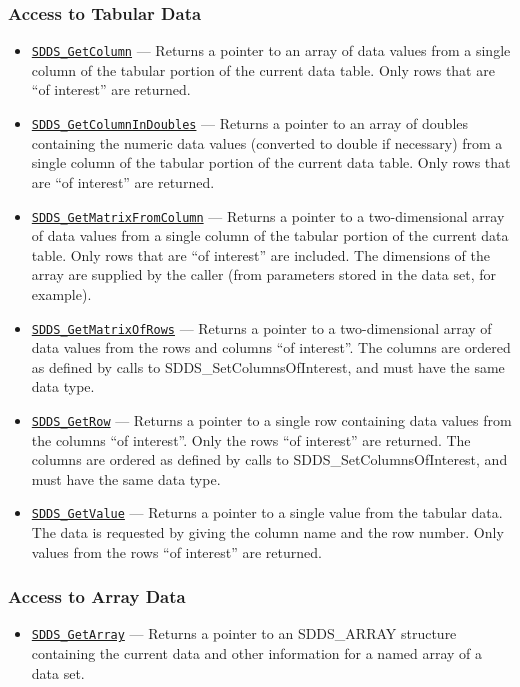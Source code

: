 \documentclass[11pt]{article}
\newcommand{\progref}[1]{\hyperref[SDDS_#1]{\tt SDDS\_#1}}
\begin{document}
\subsubsection{Access to Tabular Data}

\begin{itemize}
\item \progref{GetColumn} --- Returns a pointer to an array of data values from a single column of the tabular portion of the current data table. Only rows that are ``of interest'' are returned.
\item \progref{GetColumnInDoubles} --- Returns a pointer to an array of doubles containing the numeric data values (converted to double if necessary) from a single column of the tabular portion of the current data table. Only rows that are ``of interest'' are returned.
\item \progref{GetMatrixFromColumn} --- Returns a pointer to a two-dimensional array of data values from a single column of the tabular portion of the current data table. Only rows that are ``of interest'' are included. The dimensions of the array are supplied by the caller (from parameters stored in the data set, for example).
\item \progref{GetMatrixOfRows} --- Returns a pointer to a two-dimensional array of data values from the rows and columns ``of interest''. The columns are ordered as defined by calls to SDDS\_SetColumnsOfInterest, and must have the same data type.
\item \progref{GetRow} --- Returns a pointer to a single row containing data values from the columns ``of interest''. Only the rows ``of interest'' are returned. The columns are ordered as defined by calls to SDDS\_SetColumnsOfInterest, and must have the same data type.
\item \progref{GetValue} --- Returns a pointer to a single value from the tabular data. The data is requested by giving the column name and the row number. Only values from the rows ``of interest'' are returned. 
\end{itemize}

\subsubsection{Access to Array Data}

\begin{itemize}
\item \progref{GetArray} --- Returns a pointer to an SDDS\_ARRAY structure containing the current data and other information for a named array of a data set. 
\end{itemize}
\end{document}
